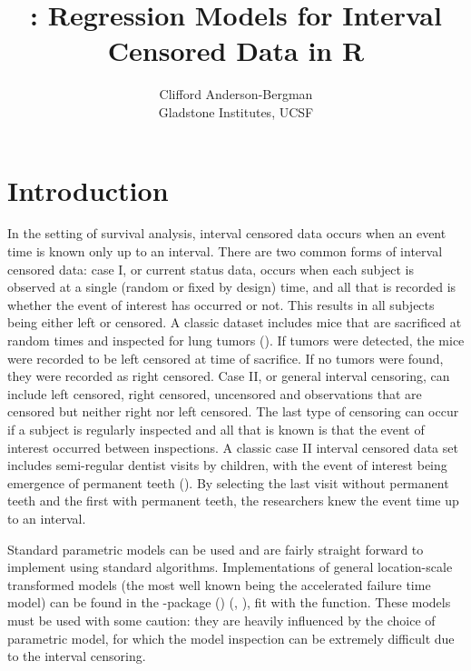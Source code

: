 \documentclass[article]{jss}
\author{Clifford Anderson-Bergman\\Gladstone Institutes, UCSF}
\title{\pkg{icenReg}: Regression Models for Interval Censored Data in R}
\begin{document}

\section[intro]{Introduction}

	In the setting of survival analysis, interval censored data occurs when an event time is known only up to an interval. There are two common forms of interval censored data: case I, or current status data, occurs when each subject is observed at a single (random or fixed by design) time, and all that is recorded is whether the event of interest has occurred or not. This results in all subjects being either left or censored. A classic dataset includes mice that are sacrificed at random times and inspected for lung tumors (\cite{mice_tumors}). If tumors were detected, the mice were recorded to be left censored at time of sacrifice. If no tumors were found, they were recorded as right censored. Case II, or general interval censoring, can include left censored, right censored, uncensored and observations that are censored but neither right nor left censored. The last type of censoring can occur if a subject is regularly inspected and all that is known is that the event of interest occurred between inspections. A classic case II interval censored data set includes semi-regular dentist visits by children, with the event of interest being emergence of permanent teeth (\cite{toothStudy}). By selecting the last visit without permanent teeth and the first with permanent teeth, the researchers knew the event time up to an interval. 
	
	Standard parametric models can be used and are fairly straight forward to implement using standard algorithms. Implementations of general location-scale transformed models (the most well known being the accelerated failure time model) can be found in the -package (\cite{R})  (\cite{R_surv}, \cite{R_surv_book}), fit with the  function. These models must be used with some caution: they are heavily influenced by the choice of parametric model, for which the model inspection can be extremely difficult due to the interval censoring. 
	
\end{document}
